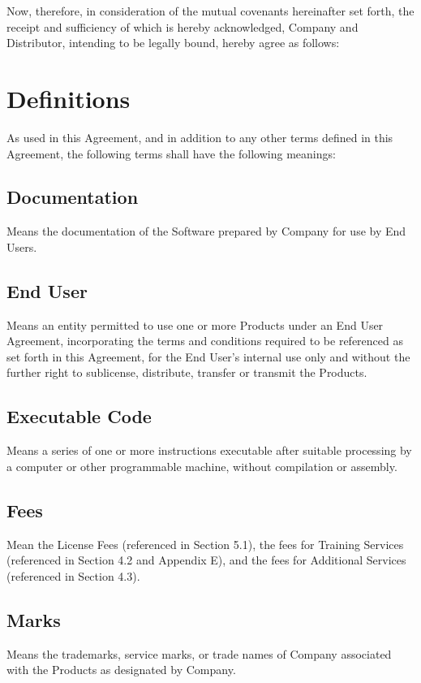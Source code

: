 \documentclass[letterpaper,10pt,openany,oneside,english]{sphinxmanual}
\begin{document}
Now, therefore, in consideration of the mutual covenants hereinafter set forth, the receipt and sufficiency of which is hereby acknowledged, Company and Distributor, intending to be legally bound, hereby agree as follows:


\section{Definitions}
\label{\detokenize{definitions:definitions}}\label{\detokenize{definitions::doc}}
As used in this Agreement, and in addition to any other terms defined in this Agreement, the following terms shall have the following meanings:


\subsection{Documentation}
\label{\detokenize{definitions:documentation}}
Means the documentation of the Software prepared by Company for use by End Users.


\subsection{End User}
\label{\detokenize{definitions:end-user}}
Means an entity permitted to use one or more Products under an End User Agreement, incorporating the terms and conditions required to be referenced as set forth in this Agreement, for the End User’s internal use only and without the further right to sublicense, distribute, transfer or transmit the Products.


\subsection{Executable Code}
\label{\detokenize{definitions:executable-code}}
Means a series of one or more instructions executable after suitable processing by a computer or other programmable machine, without compilation or assembly.


\subsection{Fees}
\label{\detokenize{definitions:fees}}
Mean the License Fees (referenced in Section 5.1), the fees for Training Services (referenced in Section 4.2 and Appendix E), and the fees for Additional Services (referenced in Section 4.3).


\subsection{Marks}
\label{\detokenize{definitions:marks}}
Means the trademarks, service marks, or trade names of Company associated with the Products as designated by Company.
\end{document}
